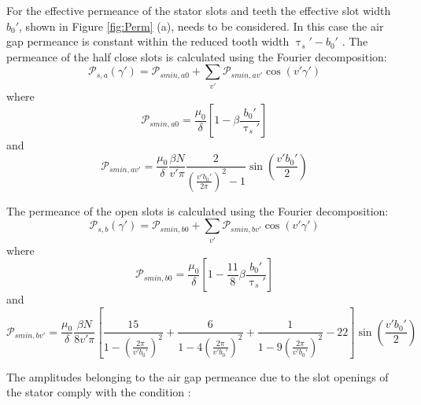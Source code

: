 For the effective permeance of the stator slots and teeth the effective slot width ${b}_{0}'$, shown in Figure \ref{fig:Perm} (a), needs to be considered. In this case the air gap permeance is constant within the reduced tooth width ${\uptau }_{s}' - {b}_{0}'$ \cite{AnaGapSal}.
The permeance of the half close slots is calculated using the Fourier decomposition:
\begin{equation}\label{Eq:SOGPermas}
	\mathcal{P}_{s,a}(\gamma') = \mathcal{P}_{smin,a0} + \sum_{v'}\mathcal{P}_{smin,av'}\cos\left(v'\gamma'\right)
\end{equation}
\hspace{1in}where
\begin{equation}\label{Eq:SOGPermsmina0}
	\mathcal{P}_{smin,a0} = \frac{{\mu}_{0}}{\delta} \left[1 - \beta\frac{{b}_{0}'}{{\uptau }_{s}'}\right]
\end{equation}
\hspace{1in}and
\begin{equation}\label{Eq:SOGPermsminav}
	\mathcal{P}_{smin,av'} = \frac{{\mu}_{0}}{\delta} \frac{\beta{N}}{v'\pi} \frac{2}{ \left(\frac{v'{b}_{0}'}{2\pi}\right)^{2} - 1} \sin\left(\frac{v'{b}_{0}'}{2}\right)
\end{equation}

The permeance of the open slots is calculated using the Fourier decomposition:
\begin{equation}\label{Eq:SOGPermbs}
	\mathcal{P}_{s,b}(\gamma') = \mathcal{P}_{smin,b0} + \sum_{v'}\mathcal{P}_{smin,bv'}\cos\left(v'\gamma'\right)
\end{equation}
\hspace{1in}where
\begin{equation}\label{Eq:SOGPermsminb0}
	\mathcal{P}_{smin,b0} = \frac{{\mu}_{0}}{\delta} \left[1 - \frac{11}{8}\beta\frac{{b}_{0}'}{{\uptau }_{s}'}\right]
\end{equation}
\hspace{1in}and
\begin{equation}\label{Eq:SOGPermsminbv}
	\mathcal{P}_{smin,bv'} = \frac{{\mu}_{0}}{\delta} \frac{\beta{N}}{8v'\pi} \left[\frac{15}{1 - \left(\frac{2\pi}{v'{b}_{0}'}\right)^{2}} + \frac{6}{1 - 4\left(\frac{2\pi}{v'{b}_{0}'}\right)^{2}} + \frac{1}{1 - 9\left(\frac{2\pi}{v'{b}_{0}'}\right)^{2}} - 22\right] \sin\left(\frac{v'{b}_{0}'}{2}\right)
\end{equation}

The amplitudes belonging to the air gap permeance due to the slot openings of the stator comply with the condition \cite{AnaGapSal}:

